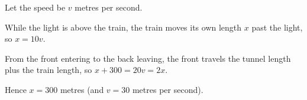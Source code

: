 Let the speed be $v$ metres per second.

While the light is above the train, the train moves its own length $x$ past the light, so $x=10v$.

From the front entering to the back leaving, the front travels the tunnel length plus the train length, so $x+300=20v=2x$.

Hence $\boxed{x=300}$ metres (and $v=30$ metres per second).

